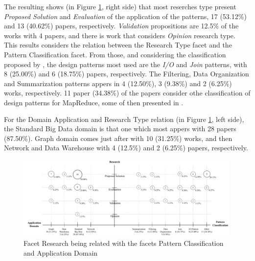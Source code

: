 The resulting shows (in Figure \ref{fig:research-patterns-domain}, right side)
that most reserches type present \textit{Proposed Solution} and
\textit{Evaluation} of the application of the patterns, 17 (53.12\%) and 13
(40.62\%) papers, respectively. \textit{Validation} propositions are 12.5\% of
the works with 4 papers, and there is work that considers \textit{Opinion}
research type. This results considers the relation between the Research Type
facet and the Pattern Classification facet. From those, and considering the
classification proposed by \cite{White:2012}, the design patterns most used are
the \textit{I/O} and \textit{Join} patterns, with 8 (25.00\%) and 6 (18.75\%)
papers, respectively.  The Filtering, Data Organization and Summarization
patterns appers in 4 (12.50\%), 3 (9.38\%) and 2 (6.25\%) works,
respectively. 11 paper (34.38\%) of the papers consider othe classification of
design patterns for MapReduce, some of then presented in \cite{pig-designpattern:2014}.
 
For the Domain Application and Research Type relation (in Figure
\ref{fig:research-patterns-domain}, left side), the Standard Big Data domain is
that one which most appers with 28 papers (87.50\%). Graph domain comes just
after with 10 (31.25\%) works, and then Network and Data Warehouse with 4
(12.5\%) and 2 (6.25\%) papers, respectively.  

\begin{figure}[hbtp]
\centering
\includegraphics[width=0.99\textwidth]{figs/Research-Patterns-Domain.pdf}
\caption{Facet Research being related with the facets Pattern
Classification and Application Domain}
\label{fig:research-patterns-domain}
\end{figure}

  
